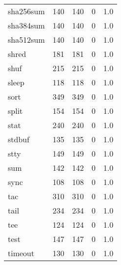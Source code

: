 \begin{tabular}{lrrrr}
sha256sum &                     140 &              140 &                 0 &                          1.0 \\
sha384sum &                     140 &              140 &                 0 &                          1.0 \\
sha512sum &                     140 &              140 &                 0 &                          1.0 \\
shred     &                     181 &              181 &                 0 &                          1.0 \\
shuf      &                     215 &              215 &                 0 &                          1.0 \\
sleep     &                     118 &              118 &                 0 &                          1.0 \\
sort      &                     349 &              349 &                 0 &                          1.0 \\
split     &                     154 &              154 &                 0 &                          1.0 \\
stat      &                     240 &              240 &                 0 &                          1.0 \\
stdbuf    &                     135 &              135 &                 0 &                          1.0 \\
stty      &                     149 &              149 &                 0 &                          1.0 \\
sum       &                     142 &              142 &                 0 &                          1.0 \\
sync      &                     108 &              108 &                 0 &                          1.0 \\
tac       &                     310 &              310 &                 0 &                          1.0 \\
tail      &                     234 &              234 &                 0 &                          1.0 \\
tee       &                     124 &              124 &                 0 &                          1.0 \\
test      &                     147 &              147 &                 0 &                          1.0 \\
timeout   &                     130 &              130 &                 0 &                          1.0 \\

\end{tabular}

